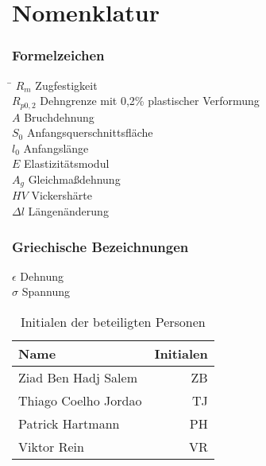 \chapter*{Nomenklatur}



\subsection*{Formelzeichen}
\begin{tabbing}
	\hspace*{2cm}\=\kill
	$R_m$ \> Zugfestigkeit \\[0.2ex]
	$R_{p0,2}$ \> Dehngrenze mit 0,2\% plastischer Verformung \\[0.2ex]
	$A$ \> Bruchdehnung \\[0.2ex]
	$S_0$ \> Anfangsquerschnittsfläche \\[0.2ex]
	$l_0$ \> Anfangslänge \\[0.2ex]
	$E$ \> Elastizitätsmodul \\[0.2ex]
	$A_g$ \> Gleichmaßdehnung \\[0.2ex]
	$HV$ \> Vickershärte \\[0.2ex]
	$\Delta l$ \> Längenänderung \\[0.2ex]
	
\end{tabbing}

\subsection*{Griechische Bezeichnungen}
\begin{tabbing}
	$\epsilon$ \> Dehnung \\[0.2ex]
	$\sigma$ \> Spannung \\[0.2ex]
	
\end{tabbing}




\begin{table}[] 
	\centering 
	\begin{tabular}{lr} 
		
		Name & \hspace{0.5cm} Initialen\\ 
		\hline 
		Ziad Ben Hadj Salem & ZB\\
		Thiago Coelho Jordao & TJ\\
		Patrick Hartmann & PH\\
		Viktor Rein & VR\\
		\hline
		
	\end{tabular} 
	\caption{Initialen der beteiligten Personen} 
	\label{tab:initialien} 
\end{table} 

